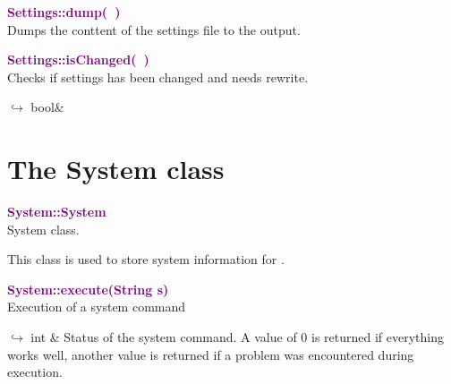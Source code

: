 
\textcolor{purple}{\textbf{Settings::dump(~)}}\label{Settings::dump()}\\
Dumps the conttent of the settings file to the output.


\textcolor{purple}{\textbf{Settings::isChanged(~)}}\label{Settings::isChanged()}\\
Checks if settings has been changed and needs rewrite.\vspace*{-0.5em}
\begin{tcolorbox}[grow to left by=-1cm, width=\textwidth-1cm,myArgs,tabularx={l|R}]
$\hookrightarrow$ bool&
\end{tcolorbox}


\section{The System class}

\textcolor{purple}{\textbf{System::System}}\label{System::System}\\
System class.

This class is used to store system information for \DynELA.

\textcolor{purple}{\textbf{System::execute(String s)}}\label{System::execute(String s)}\\
Execution of a system command\vspace*{-0.5em}
\begin{tcolorbox}[grow to left by=-1cm, width=\textwidth-1cm,myArgs,tabularx={l|R}]
$\hookrightarrow$ int & Status of the system command. A value of 0 is returned if everything works well, another value is returned if a problem was encountered during execution.
\end{tcolorbox}

